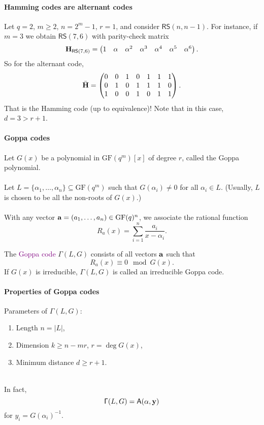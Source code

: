 \documentclass[a4paper, 11pt, openany]{book}
\numberwithin{equation}{section}
\theoremstyle{plain}
\theoremstyle{definition}
\newcommand{\GF}{\mathrm{GF}}
\newcommand{\Define}[1]{\textcolor{purple}{#1}}
\newcommand{\code}[1]{\mathsf{#1}}
\newcommand{\ReedSolomon}           {\code{RS}}
\newcommand{\Alternant}             {\code{A}}
\newcommand{\Goppa}                 {\code{\Gamma}}
\begin{document}
\paragraph{Hamming codes are alternant codes}

Let $q=2$, $m \ge 2$, $n = 2^m - 1$, $r=1$, and consider $\ReedSolomon(n,n-1)$. For instance, if $m=3$ we obtain $\ReedSolomon(7,6)$ with parity-check matrix
\[
	{\bf H}_{\ReedSolomon(7,6)} = \begin{pmatrix}
	1 & \alpha & \alpha^2 & \alpha^3 & \alpha^4 & \alpha^5 & \alpha^6
	\end{pmatrix}.
\]
So for the alternant code, 
\[
	\bar{\bf H}  = \begin{pmatrix}
	0 & 0 & 1 & 0 & 1 & 1 & 1 \\
	0 & 1 & 0 & 1 & 1 & 1 & 0 \\
	1 & 0 & 0 & 1 & 0 & 1 & 1 
	\end{pmatrix}.
\]
That is the Hamming code (up to equivalence)! Note that in this case, $d = 3 > r + 1$.





\paragraph{Goppa codes}

Let $G(x)$ be a polynomial in $\GF(q^m)[x]$ of degree $r$, called the Goppa polynomial.\\
~\\
Let $L = \{ \alpha_1, \dots, \alpha_n \} \subseteq \GF(q^m)$ such that $G(\alpha_i) \ne 0$ for all $\alpha_i \in L$. (Usually, $L$ is chosen to be all the non-roots of $G(x)$.)\\
~\\
With any vector ${\bf a} = (a_1, \dots, a_n) \in \GF(q)^n$, we associate the rational function
\[
	R_a(x) = \sum_{i=1}^n \frac{ a_i }{ x - \alpha_i }.
\]

The \Define{Goppa code} $\Goppa(L,G)$ consists of all vectors ${\bf a}$ such that
\[
	R_a(x) \equiv 0 \mod G(x).
\]
If $G(x)$ is irreducible, $\Goppa(L,G)$ is called an irreducible Goppa code.



\paragraph{Properties of Goppa codes}
Parameters of $\Goppa(L,G)$:
\begin{enumerate}
	\item Length $n = |L|$, 

	\item Dimension $k \ge n - mr$, $r = \deg G(x)$,
	
	\item Minimum distance $d \ge r + 1$.
\end{enumerate}
~\\
In fact,
\[
	\Goppa(L,G) = \Alternant({\bf \alpha}, {\bf y})
\]
for $y_i = G(\alpha_i)^{-1}$.
\end{document}
